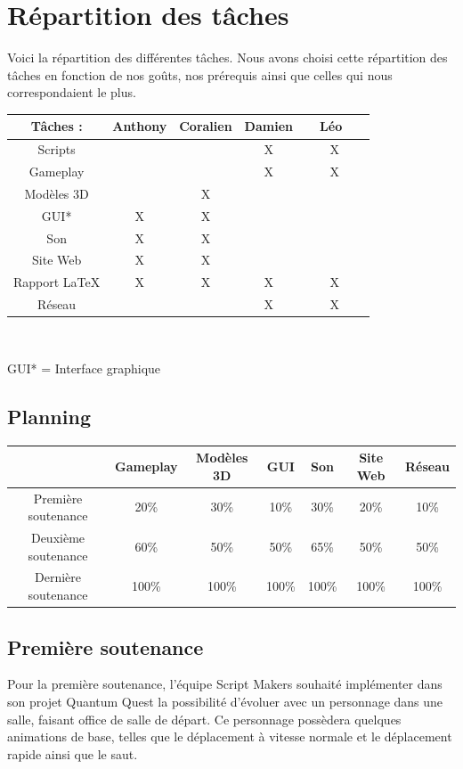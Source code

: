 \documentclass[A4paper,11pt]{article}
\begin{document}
\section{R\'epartition des t\^aches}
Voici la r\'epartition des diff\'erentes t\^aches. Nous avons choisi cette r\'epartition des t\^aches en fonction de nos go\^uts, nos pr\'erequis ainsi que celles qui nous correspondaient le plus.\\
\begin{center}
\begin{tabular}{|c|c|c|c|c|}
\hline
T\^aches : & Anthony & Coralien & Damien & ~~L\'eo~~~\\
\hline
Scripts &   &   & X & X\\
\hline
Gameplay &   &   & X & X\\
\hline
Mod\`eles 3D &   & X &   &  \\
\hline
GUI* & X & X  &  & \\
\hline
Son & X & X &   &  \\
\hline
Site Web & X & X &   &  \\
\hline
Rapport LaTeX & X & X & X & X\\
\hline
R\'eseau & & & X & X\\
\hline
\end{tabular}\\
\end{center}
GUI* = Interface graphique
\begin{center}
\section{Planning}
\begin{tabular}{|c|c|c|c|c|c|c|}
\hline
 & Gameplay & Mod\`eles 3D & GUI & Son & Site Web & R\'eseau\\
\hline
Premi\`ere soutenance & 20\% & 30\% & 10\% & 30\% & 20\% & 10\%\\
\hline
Deuxi\`eme soutenance & 60\% & 50\% & 50\% & 65\% & 50\% & 50\%\\
\hline
Derni\`ere soutenance &100\% & 100\% & 100\% & 100\% & 100\% & 100\%\\
\hline
\end{tabular}
\end{center}
\subsection{Premi\`ere soutenance}
Pour la premi\`ere soutenance, l'\'equipe Script Makers souhait\'e impl\'ementer dans son projet Quantum Quest la possibilit\'e d'\'evoluer avec un personnage dans une salle, faisant office de salle de d\'epart. Ce personnage poss\`edera quelques animations de base, telles que le d\'eplacement \`a vitesse normale et le d\'eplacement rapide ainsi que le saut.\\ 
\end{document}
